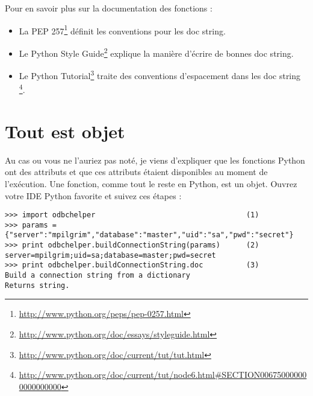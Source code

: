 
\medskip
\noindent Pour en savoir plus sur la documentation des fonctions :
\begin{itemize}
    \item{La PEP 257\footnote{\url{http://www.python.org/peps/pep-0257.html}} définit les conventions pour les doc string.}
    \item{Le Python Style Guide\footnote{\url{http://www.python.org/doc/essays/styleguide.html}} explique la manière d'écrire de bonnes doc string.}
    \item{Le Python Tutorial\footnote{\url{http://www.python.org/doc/current/tut/tut.html}} traite des conventions d'espacement dans les doc string \footnote{\url{http://www.python.org/doc/current/tut/node6.html\#SECTION006750000000000000000}}.}
\end{itemize}

\section{Tout est objet}
Au cas ou vous ne l'auriez pas noté, je viens d'expliquer que les fonctions Python ont des attributs et que ces attributs étaient disponibles au moment de l'exécution. 
Une fonction, comme tout le reste en Python, est un objet. Ouvrez votre IDE Python favorite et suivez ces étapes :

\begin{example}
\begin{lstlisting}
>>> import odbchelper                                   (1)
>>> params = {"server":"mpilgrim","database":"master","uid":"sa","pwd":"secret"}
>>> print odbchelper.buildConnectionString(params)      (2)
server=mpilgrim;uid=sa;database=master;pwd=secret
>>> print odbchelper.buildConnectionString.doc          (3)
Build a connection string from a dictionary
Returns string.
\end{lstlisting}
\end{example}

